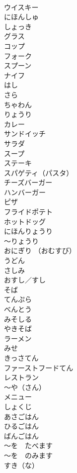 \documentclass[8pt]{extreport}
\begin{document}
\begin{CJK}{UTF8}{min}
\\	ウイスキー	
\\	にほんしゅ	
\\	しょっき	
\\	グラス	
\\	コップ	
\\	フォーク	
\\	スプーン	
\\	ナイフ	
\\	はし	
\\	さら	
\\	ちゃわん	
\\	りょうり	
\\	カレー	
\\	サンドイッチ	
\\	サラダ	
\\	スープ	
\\	ステーキ	
\\	スパゲティ（パスタ）	
\\	チーズバーガー	
\\	ハンバーガー	
\\	ピザ	
\\	フライドポテト	
\\	ホットドッグ	
\\	にほんりょうり	
\\	～りょうり	
\\	おにぎり （おむすび）	
\\	うどん	
\\	さしみ	
\\	おすし／すし	
\\	そば	
\\	てんぷら	
\\	べんとう	
\\	みそしる	
\\	やきそば	
\\	ラーメン	
\\	みせ	
\\	きっさてん	
\\	ファーストフードてん	
\\	レストラン	
\\	～や（さん）	
\\	メニュー	
\\	しょくじ	
\\	あさごはん	
\\	ひるごはん	
\\	ばんごはん	
\\	～を　たべます	
\\	～を　のみます	
\\	すき（な）	

\end{CJK}
\end{document}

